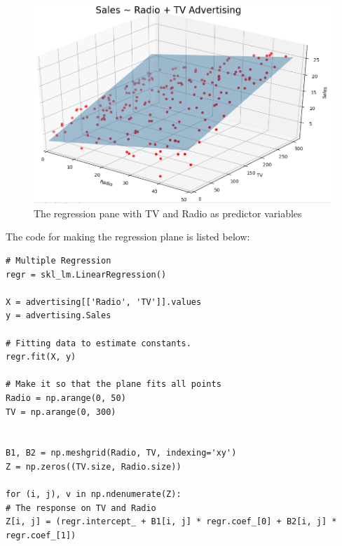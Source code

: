 \begin{figure}[H]
	\centering
	\includegraphics[width=\textwidth]{Img/Multi_reg_plane.PNG}
	\caption{The regression pane with TV and Radio as predictor variables}
	\label{fig:Multi_reg_plane}
\end{figure} 

The code for making the regression plane is listed below:

\begin{lstlisting}
# Multiple Regression
regr = skl_lm.LinearRegression()

X = advertising[['Radio', 'TV']].values
y = advertising.Sales

# Fitting data to estimate constants.
regr.fit(X, y)

# Make it so that the plane fits all points
Radio = np.arange(0, 50)
TV = np.arange(0, 300)


B1, B2 = np.meshgrid(Radio, TV, indexing='xy')
Z = np.zeros((TV.size, Radio.size))

for (i, j), v in np.ndenumerate(Z):
# The response on TV and Radio
Z[i, j] = (regr.intercept_ + B1[i, j] * regr.coef_[0] + B2[i, j] * regr.coef_[1])
\end{lstlisting}


